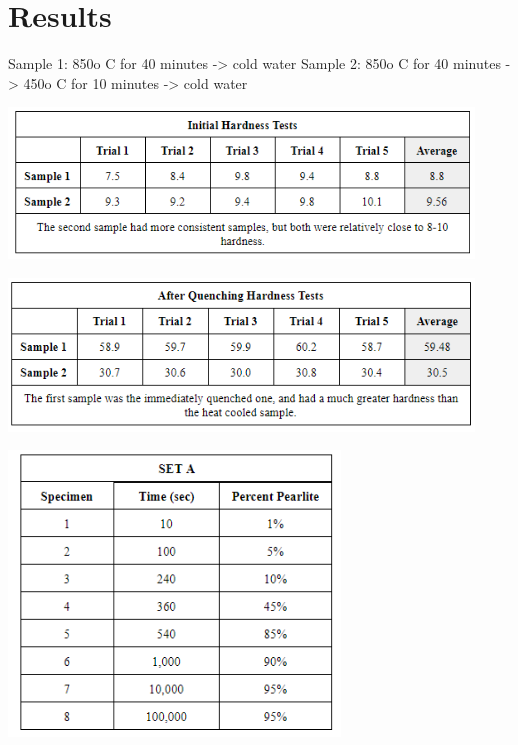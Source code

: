 \documentclass{article}
\begin{document}
\section{Results}
Sample 1: 850o C for 40 minutes -> cold water
Sample 2: 850o C for 40 minutes -> 450o C for 10 minutes ->  cold water

\begin{center}
\includegraphics[width=350pt]{1.png}
\end{center}

\begin{center}
\includegraphics[width=350pt]{2.png}
\end{center}

\begin{center}
\includegraphics[width=250pt]{3.png}
\end{center}
\end{document}
